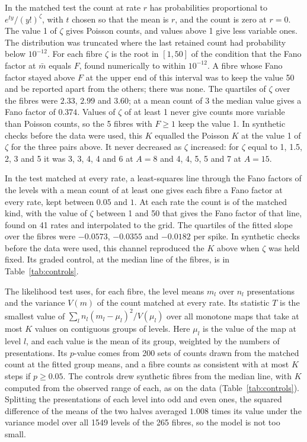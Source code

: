 \documentclass[10pt,letterpaper]{article}
\begin{document}
In the matched test the count at rate $r$ has probabilities proportional to $e^{ty}/(y!)^{\zeta}$, with $t$ chosen so that the mean is
$r$, and the count is zero at $r=0$. The value 1 of $\zeta$ gives Poisson counts, and values above 1 give less variable ones. The
distribution was truncated where the last retained count had probability below $10^{-12}$. For each fibre $\zeta$ is the root in
$[1,50]$ of the condition that the Fano factor at $\bar m$ equals $F$, found numerically to within $10^{-12}$. A fibre whose Fano factor
stayed above $F$ at the upper end of this interval was to keep the value 50 and be reported apart from the others; there was none. The
quartiles of $\zeta$ over the fibres were $2.33$, $2.99$ and $3.60$; at a mean count of 3 the median value gives a Fano factor of
$0.374$. Values of $\zeta$ of at least 1 never give counts more variable than Poisson counts, so the 5 fibres with $F\ge1$ keep the
value 1. In synthetic checks before the data were used, this $K$ equalled
the Poisson $K$ at the value 1 of $\zeta$ for the three pairs above. It never decreased as $\zeta$ increased: for $\zeta$ equal to 1,
1.5, 2, 3 and 5 it was 3, 3, 4, 4 and 6 at $A=8$ and 4, 4, 5, 5 and 7 at $A=15$.

In the test matched at every rate, a least-squares line through the Fano factors of the levels with a mean count of at least one
gives each fibre a Fano factor at every rate, kept between $0.05$ and $1$. At each rate the count is of the matched kind,
with the value of $\zeta$ between 1 and 50 that gives the Fano factor of that line, found on 41 rates and interpolated
to the grid. The quartiles of the fitted slope over the fibres were $-0.0573$, $-0.0355$ and $-0.0182$ per spike. In synthetic checks
before the data were used, this channel reproduced the $K$ above when $\zeta$ was held fixed. Its graded control, at the median line of the fibres, is in Table~\ref{tab:controls}.

The likelihood test uses, for each fibre, the level means $m_l$ over $n_l$ presentations and the variance $V(m)$ of the count matched
at every rate. Its statistic $T$ is the smallest value of $\sum_l n_l(m_l-\mu_l)^2/V(\mu_l)$ over all monotone maps that take at most $K$ values
on contiguous groups of levels. Here $\mu_l$ is the value of the map at level $l$, and each value is the mean of its group, weighted
by the numbers of presentations. Its $p$-value comes
from 200 sets of counts drawn from the matched count at the fitted group means, and a fibre counts as consistent with at most $K$
steps if $p\ge0.05$. The controls drew synthetic fibres from the median line, with $K$ computed from the observed range of each,
as on the data (Table~\ref{tab:controls}). Splitting the presentations of each level into odd and even ones, the squared difference of
the means of the two halves averaged $1.008$ times its value under the variance model over all 1549 levels of the 265 fibres, so the model is not too small.
\end{document}
